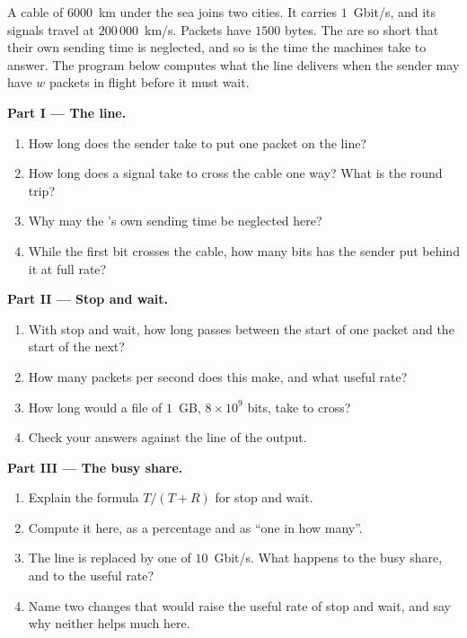 \begin{problem}\label{pb:g11:network-protocols:1}
A cable of $6000$~km under the sea joins two cities. It carries $1$~Gbit/s, and its signals travel at
$200\,000$~km/s. Packets have $1500$ bytes. The  are so short that their own sending time is
neglected, and so is the time the machines take to answer. The program below computes what the line delivers when the
sender may have $w$ packets in flight before it must wait.

\label{lst:g11:network-protocols:sea-link}

\label{out:g11:network-protocols:sea-link}

\medskip\noindent\textbf{Part I --- The line.}
\begin{enumerate}
  \item How long does the sender take to put one packet on the line?
  \item How long does a signal take to cross the cable one way? What is the round trip?
  \item Why may the 's own sending time be neglected here?
  \item While the first bit crosses the cable, how many bits has the sender put behind it at full rate?
\end{enumerate}

\medskip\noindent\textbf{Part II --- Stop and wait.}
\begin{enumerate}[resume]
  \item With stop and wait, how long passes between the start of one packet and the start of the next?
  \item How many packets per second does this make, and what useful rate?
  \item How long would a file of $1$~GB, $8 \times 10^9$ bits, take to cross?
  \item Check your answers against the line  of the output.
\end{enumerate}

\medskip\noindent\textbf{Part III --- The busy share.}
\begin{enumerate}[resume]
  \item Explain the formula $T / (T + R)$ for stop and wait.
  \item Compute it here, as a percentage and as ``one in how many''.
  \item The line is replaced by one of $10$~Gbit/s. What happens to the busy share, and to the useful rate?
  \item Name two changes that would raise the useful rate of stop and wait, and say why neither helps much here.
\end{enumerate}


\end{problem}
